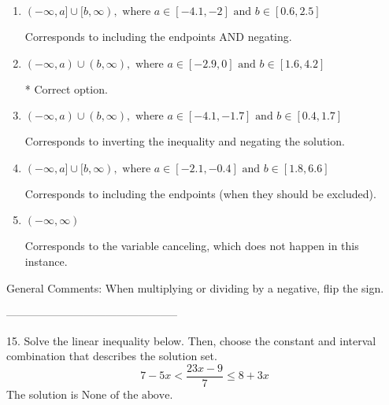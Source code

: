 \documentclass{extbook}[14pt]
\begin{document}
\begin{enumerate}[label=\Alph*.] 
\item $ (-\infty, a] \cup [b, \infty), \text{ where } a \in [-4.1, -2] \text{ and } b \in [0.6, 2.5] $ 

 Corresponds to including the endpoints AND negating. 
\item $ (-\infty, a) \cup (b, \infty), \text{ where } a \in [-2.9, 0] \text{ and } b \in [1.6, 4.2] $ 

  * Correct option. 
\item $ (-\infty, a) \cup (b, \infty), \text{ where } a \in [-4.1, -1.7] \text{ and } b \in [0.4, 1.7] $ 

 Corresponds to inverting the inequality and negating the solution. 
\item $ (-\infty, a] \cup [b, \infty), \text{ where } a \in [-2.1, -0.4] \text{ and } b \in [1.8, 6.6] $ 

 Corresponds to including the endpoints (when they should be excluded). 
\item $ (-\infty, \infty) $ 

 Corresponds to the variable canceling, which does not happen in this instance. 
\end{enumerate} 
 
General Comments: When multiplying or dividing by a negative, flip the sign.

-----------------------------------------------

15. Solve the linear inequality below. Then, choose the constant and interval combination that describes the solution set.
\[ 7 - 5 x < \frac{23 x - 9}{7} \leq 8 + 3 x \] 
The solution is $ \text{None of the above.} $ 
\end{document}
